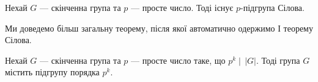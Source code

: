 \documentclass{math_library}
\begin{document}

\begin{theorem}
Нехай $G$ --- скінченна група та $p$ --- просте число. Тоді існує $p$-підгрупа Сілова.
\end{theorem}

Ми доведемо більш загальну теорему, після якої автоматично одержимо І теорему Сілова.

\begin{theorem}
Нехай $G$ --- скінченна група та $p$ --- просте число таке, що $p^k \mid \, |G|$. Тоді група $G$ містить підгрупу порядка $p^k$.
\end{theorem}
\end{document}
